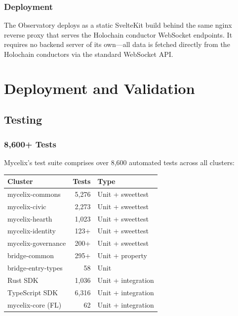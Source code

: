 \documentclass[12pt]{book}
\begin{document}
\section{Deployment}

The Observatory deploys as a static SvelteKit build behind the same nginx
reverse proxy that serves the Holochain conductor WebSocket endpoints. It
requires no backend server of its own---all data is fetched directly from
the Holochain conductors via the standard WebSocket API.



\part{Deployment and Validation}

\chapter{Testing}

\section{8,600+ Tests}

Mycelix's test suite comprises over 8,600 automated tests across all clusters:

\begin{longtable}{lrl}
\toprule
\textbf{Cluster} & \textbf{Tests} & \textbf{Type} \\
\midrule
\endhead
mycelix-commons & 5,276 & Unit + sweettest \\
mycelix-civic & 2,273 & Unit + sweettest \\
mycelix-hearth & 1,023 & Unit + sweettest \\
mycelix-identity & 123+ & Unit + sweettest \\
mycelix-governance & 200+ & Unit + sweettest \\
bridge-common & 295+ & Unit + property \\
bridge-entry-types & 58 & Unit \\
Rust SDK & 1,036 & Unit + integration \\
TypeScript SDK & 6,316 & Unit + integration \\
mycelix-core (FL) & 62 & Unit + integration \\
\bottomrule
\end{longtable}
\end{document}
